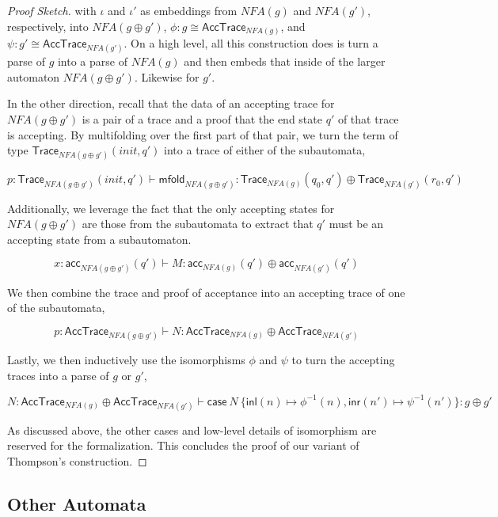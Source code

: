 \documentclass[acmsmall,screen,nonacm]{acmart}
\begin{document}
\begin{proof}[Proof Sketch]
  with $\iota$ and $\iota'$ as embeddings from $NFA(g)$ and
  $NFA(g')$, respectively, into $NFA(g \oplus g')$,
  $\phi: g \cong \mathsf{AccTrace}_{NFA(g)}$, and $\psi: g' \cong \mathsf{AccTrace}_{NFA(g')}$. On a
  high level, all this construction does is turn a parse of
  $g$ into a parse of $NFA(g)$ and then embeds that inside
  of the larger automaton $NFA(g \oplus g')$. Likewise for $g'$.

  In the other direction, recall that the data of an
  accepting trace for $NFA(g \oplus g')$ is a pair of a
  trace and a proof that
  the end state $q'$ of that trace is accepting. By
  multifolding over the first part of that pair, we turn the
  term of type
  $\mathsf{Trace}_{NFA(g \oplus g')}(init , q')$ into a
  trace of either of the subautomata,

  \[
    p : \mathsf{Trace}_{NFA(g \oplus g')}(init , q') \vdash \mathsf{mfold}_{NFA(g \oplus g')} : \mathsf{Trace}_{NFA(g)}(q_{0} , q') \oplus \mathsf{Trace}_{NFA(g')}(r_{0} , q')
  \]

  Additionally, we leverage the fact that the only accepting
  states for $NFA(g \oplus g')$ are those from the
  subautomata to extract that $q'$ must be an accepting
  state from a subautomaton.

  \[
    x : \mathsf{acc}_{NFA(g \oplus g')}(q') \vdash M : \mathsf{acc}_{NFA(g)}(q') \oplus \mathsf{acc}_{NFA(g')}(q')
  \]

  We then combine the trace and proof of acceptance into an
  accepting trace of one of the subautomata,

  \[
    p : \mathsf{AccTrace}_{NFA(g \oplus g')} \vdash N : \mathsf{AccTrace}_{NFA(g)} \oplus \mathsf{AccTrace}_{NFA(g')}
  \]

  Lastly, we then inductively use the isomorphisms $\phi$
  and $\psi$ to turn the accepting traces into a parse of
  $g$ or $g'$,

  \[
     N : \mathsf{AccTrace}_{NFA(g)} \oplus \mathsf{AccTrace}_{NFA(g')} \vdash \mathsf{case}~N~\{\mathsf{inl}(n) \mapsto \phi^{-1}(n), \mathsf{inr}(n') \mapsto \psi^{-1}(n')\} : g \oplus g'
  \]

  As discussed above, the other cases and low-level details
  of isomorphism are reserved for the formalization. This
  concludes the proof of our variant of Thompson's construction.
\end{proof}

\subsection{Other Automata}
\end{document}

